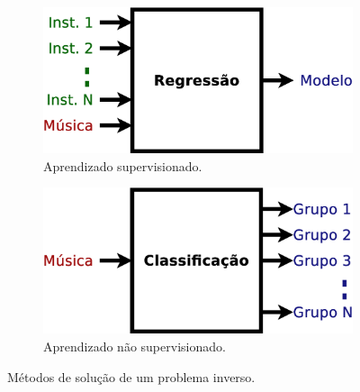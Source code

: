 \begin{figure}[ht]
\centering
    \begin{subfigure}[t]{.45\textwidth}
      \centering
      \includegraphics[width=.975\linewidth]{chapters/cap-musicalidade-tecnica/seguindo-instrumentos-1}  
      \caption{Aprendizado supervisionado.}
      \label{fig:seguindo-instrumentos-1}
    \end{subfigure}
    \hfill
    \begin{subfigure}[t]{.45\textwidth}
      \centering
      \includegraphics[width=.975\linewidth]{chapters/cap-musicalidade-tecnica/seguindo-instrumentos-2}  
      \caption{Aprendizado não supervisionado.}
      \label{fig:seguindo-instrumentos-2}
    \end{subfigure}
    \caption{Métodos de solução de um problema inverso.}
    \label{fig:seguindo-instrumentos}
\end{figure}



